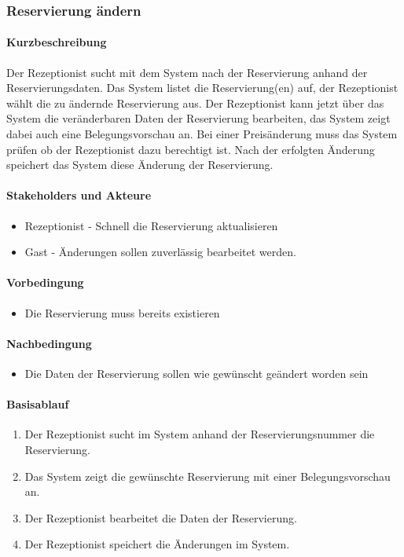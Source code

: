 \subsubsection{Reservierung ändern}
\label{UseCase_ReservierungÄndern}

\paragraph{Kurzbeschreibung}
Der \Gls{Rezeptionist} sucht mit dem System nach der \Gls{Reservierung} anhand der Reservierungsdaten. Das System listet die \Gls{Reservierung}(en) auf,  der \Gls{Rezeptionist} wählt die zu ändernde \Gls{Reservierung} aus. Der \Gls{Rezeptionist} kann jetzt über das System die veränderbaren Daten der \Gls{Reservierung} bearbeiten, das System zeigt dabei auch eine \Gls{Belegungsvorschau} an. Bei einer Preisänderung muss das System prüfen ob der \Gls{Rezeptionist} dazu berechtigt ist. Nach der erfolgten Änderung speichert das System diese Änderung der \Gls{Reservierung}.

\paragraph{Stakeholders und Akteure}
\begin{itemize}
	\item \Gls{Rezeptionist} - Schnell die \Gls{Reservierung} aktualisieren
	\item \Gls{Gast} - Änderungen sollen zuverlässig bearbeitet werden.
\end{itemize}

\paragraph{Vorbedingung}
\begin{itemize}
	\item Die \Gls{Reservierung} muss bereits existieren
\end{itemize}

\paragraph{Nachbedingung}
\begin{itemize}
	\item Die Daten der \Gls{Reservierung} sollen wie gewünscht geändert worden sein
\end{itemize}

\paragraph{Basisablauf}
\begin{enumerate}
	\item Der \Gls{Rezeptionist} sucht im System anhand der \Gls{Reservierungsnummer} die \Gls{Reservierung}.
	\item Das System zeigt die gewünschte \Gls{Reservierung} mit einer \Gls{Belegungsvorschau} an.
	\item Der \Gls{Rezeptionist} bearbeitet die Daten der \Gls{Reservierung}.
	\item Der \Gls{Rezeptionist} speichert die Änderungen im System.
\end{enumerate}

